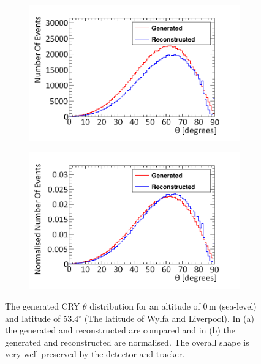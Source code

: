 \begin{figure}[!h]
\centering
\begin{subfigure}{.5\textwidth}
  \centering
  \includegraphics[width=\linewidth]{Chapter6/Figs/Raster/thetaGenRecoCryMedText.png}
  \captionsetup{width=.9\linewidth}
  \caption{}
  \label{subFig:thetaGenRecoCry}
\end{subfigure}%
\begin{subfigure}{.5\textwidth}
  \centering
\includegraphics[width=\linewidth]{Chapter6/Figs/Raster/thetaGenRecoCryNormMedText.png}
  \captionsetup{width=.9\linewidth}
  \caption{}
  \label{subFig:thetaGenRecoCryNorm}
\end{subfigure}
\caption{The generated CRY $\theta$ distribution for an altitude of 0\,m (sea-level) and latitude of 53.4$^\circ$ (The latitude of Wylfa and Liverpool). In (a) the generated and reconstructed are compared and in (b) the generated and reconstructed are normalised. The overall shape is very well preserved by the detector and tracker.}
\label{fig:thetaGenRecoCryAndNorm}
\end{figure}

